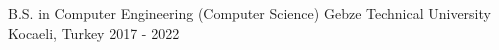 

\begin{cventries}

  \cventry
    {B.S. in Computer Engineering (Computer Science)} %
    {Gebze Technical University} %
    {Kocaeli, Turkey} %
    {2017 - 2022} %
    {
      \begin{cvitems} %
      \end{cvitems}
    }

\end{cventries}
